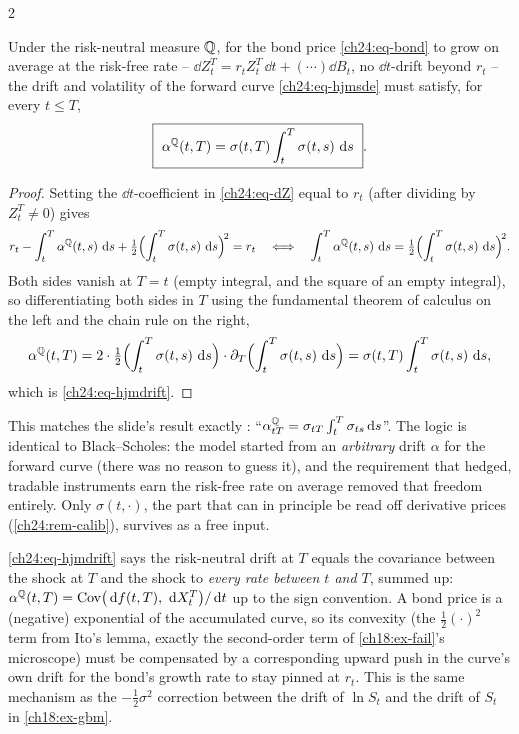 \begin{paracol}{2}
\begin{theorem}\label{ch24:thm-hjm}
Under the risk-neutral measure $\mathbb{Q}$, for the bond price \eqref{ch24:eq-bond} to grow on average at the risk-free rate -- $\dd Z_t^T=r_tZ_t^T\,\dd t+(\cdots)\dd B_t$, no $\dd t$-drift beyond $r_t$ -- the drift and volatility of the forward curve \eqref{ch24:eq-hjmsde} must satisfy, for every $t\le T$,
\begin{equation}\label{ch24:eq-hjmdrift}
  \boxed{\ \alpha^{\mathbb{Q}}(t,T)=\sigma(t,T)\int_t^T\sigma(t,s)\,\,\mathrm{d} s\ } .
\end{equation}
\end{theorem}
\begin{proof}
Setting the $\dd t$-coefficient in \eqref{ch24:eq-dZ} equal to $r_t$ (after dividing by $Z_t^T\ne0$) gives
\[
  r_t-\int_t^T\alpha^{\mathbb{Q}}(t,s)\,\,\mathrm{d} s+\tfrac12\Bigl(\int_t^T\sigma(t,s)\,\,\mathrm{d} s\Bigr)^{\!2}=r_t
  \quad\Longleftrightarrow\quad
  \int_t^T\alpha^{\mathbb{Q}}(t,s)\,\,\mathrm{d} s=\tfrac12\Bigl(\int_t^T\sigma(t,s)\,\,\mathrm{d} s\Bigr)^{\!2}.
\]
Both sides vanish at $T=t$ (empty integral, and the square of an empty integral), so differentiating both sides in $T$ using the fundamental theorem of calculus on the left and the chain rule on the right,
\[
  \alpha^{\mathbb{Q}}(t,T)=2\cdot\tfrac12\Bigl(\int_t^T\sigma(t,s)\,\,\mathrm{d} s\Bigr)\cdot\partial_T\Bigl(\int_t^T\sigma(t,s)\,\,\mathrm{d} s\Bigr)=\sigma(t,T)\int_t^T\sigma(t,s)\,\,\mathrm{d} s ,
\]
which is \eqref{ch24:eq-hjmdrift}.
\end{proof}
This matches the slide's result exactly : ``$\alpha^{\mathbb{Q}}_{tT}=\sigma_{tT}\int_t^T\sigma_{ts}\,\mathrm{d} s$''. The logic is identical to Black--Scholes: the model started from an \emph{arbitrary} drift $\alpha$ for the forward curve (there was no reason to guess it), and the requirement that hedged, tradable instruments earn the risk-free rate on average removed that freedom entirely. Only $\sigma(t,\cdot)$, the part that can in principle be read off derivative prices (\cref{ch24:rem-calib}), survives as a free input.

\begin{intuition}
\eqref{ch24:eq-hjmdrift} says the risk-neutral drift at $T$ equals the covariance between the shock at $T$ and the shock to \emph{every rate between $t$ and $T$}, summed up: $\alpha^{\mathbb{Q}}(t,T)=\operatorname{Cov}\bigl(\,\mathrm{d} f(t,T),\,\,\mathrm{d} X_t^T\bigr)/\,\mathrm{d} t$ up to the sign convention. A bond price is a (negative) exponential of the accumulated curve, so its convexity (the $\tfrac12(\cdot)^2$ term from Ito's lemma, exactly the second-order term of \cref{ch18:ex-fail}'s microscope) must be compensated by a corresponding upward push in the curve's own drift for the bond's growth rate to stay pinned at $r_t$. This is the same mechanism as the $-\tfrac12\sigma^2$ correction between the drift of $\ln S_t$ and the drift of $S_t$ in \cref{ch18:ex-gbm}.
\end{intuition}


\end{paracol}
